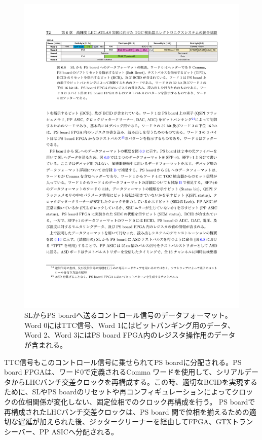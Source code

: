     \begin{figure} 
        \centering
        \includegraphics[width=16cm]{fig/Intro/TGC_PSBdownlink.pdf}
        \caption[SLからPS boardへ送るコントロールデータのフォーマット]{SLからPS boardへ送るコントロール信号のデータフォーマット\cite{mt_aoki}。Word 0にはTTC信号、Word 1にはビットバンギング用のデータ、Word 2、Word 3にはPS board FPGA内のレジスタ操作用のデータが含まれる。}
        \label{TGC_PSBdownlink}
    \end{figure}
    
    TTC信号もこのコントロール信号に乗せられてPS boardに分配される。PS board FPGAは、ワード0で定義されるComma ワードを使用して、シリアルデータからLHCバンチ交差クロックを再構成する。この時、適切なBCIDを実現するために、SLやPS boardのリセットや再コンフィギュレーションによってクロックの位相関係が変化しない、固定位相でのクロック再構成を行う。
    PS boardで再構成されたLHCバンチ交差クロックは、PS board 間で位相を揃えるための適切な遅延が加えられた後、ジッタークリーナーを経由してFPGA、GTXトランシーバー、PP ASICへ分配される。

